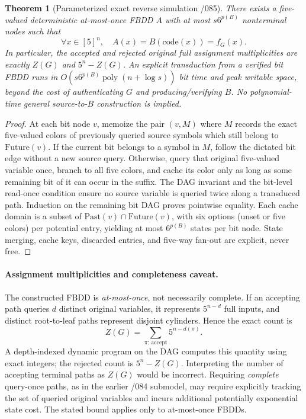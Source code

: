 \documentclass[11pt]{article}
\newtheorem{theorem}{Theorem}
\begin{document}
\begin{theorem}[Parameterized exact reverse simulation /085]
There exists a five-valued deterministic at-most-once FBDD $A$
with at most $s6^{p(B)}$ nonterminal nodes such that
\[
 \forall x\in[5]^n,\quad A(x)=B(\mathrm{code}(x))=f_G(x).
\]
In particular, the accepted and rejected original \emph{full assignment}
multiplicities are exactly $Z(G)$ and $5^n-Z(G)$. An explicit
transduction from a verified bit FBDD runs in
$O(s6^{p(B)}\operatorname{poly}(n+\log s))$ bit time and peak writable
space, beyond the cost of authenticating $G$ and producing/verifying $B$.
No polynomial-time general source-to-$B$ construction is implied.
\end{theorem}
\begin{proof}
At each bit node $v$, memoize the pair $(v,M)$ where $M$ records
the exact five-valued colors of previously queried source symbols
which still belong to $\mathrm{Future}(v)$. If the current bit belongs
to a symbol in $M$, follow the dictated bit edge without a new source
query. Otherwise, query that original five-valued variable once,
branch to all five colors, and cache its color only as long as some
remaining bit of it can occur in the suffix. The DAG invariant and the
bit-level read-once condition ensure no source variable is queried
twice along a transduced path. Induction on the remaining bit DAG
proves pointwise equality. Each cache domain is a subset of
$\mathrm{Past}(v)\cap\mathrm{Future}(v)$, with six options (unset or five
colors) per potential entry, yielding at most $6^{p(B)}$ states per
bit node. State merging, cache keys, discarded entries, and five-way
fan-out are explicit, never free.
\end{proof}

\paragraph{Assignment multiplicities and completeness caveat.}
The constructed FBDD is \emph{at-most-once}, not necessarily complete.
If an accepting path queries $d$ distinct original variables, it
represents $5^{n-d}$ full inputs, and distinct root-to-leaf paths
represent disjoint cylinders. Hence the exact count is
\[
 Z(G)=\sum_{\pi:\,\mathrm{accept}}5^{n-d(\pi)}.
\]
A depth-indexed dynamic program on the DAG computes this quantity using
exact integers; the rejected count is $5^n-Z(G)$. Interpreting the
number of accepting terminal paths as $Z(G)$ would be incorrect.
Requiring \emph{complete} query-once paths, as in the earlier /084
submodel, may require explicitly tracking the set of queried original
variables and incurs additional potentially exponential state cost.
The stated bound applies only to at-most-once FBDDs.
\end{document}
